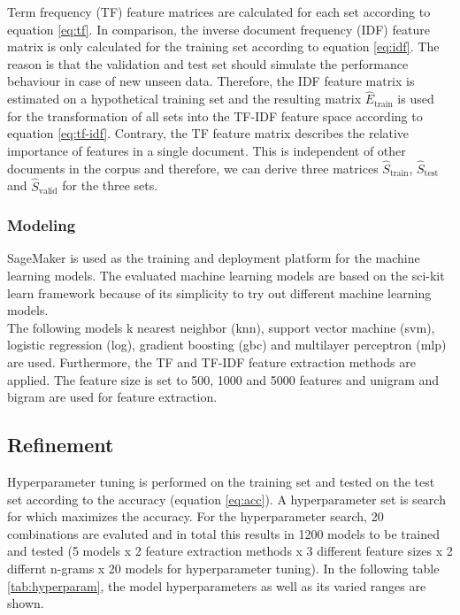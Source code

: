 \documentclass[a4paper,12pt,nottoc]{article}
\begin{document}
\noindent Term frequency (TF) feature matrices are calculated for each set according to equation \ref{eq:tf}. In comparison, the inverse document frequency (IDF) feature matrix is only calculated for the training set according to equation \ref{eq:idf}. The reason is that the validation and test set should simulate the performance behaviour in case of new unseen data. Therefore,  the IDF feature matrix is estimated on a hypothetical training set and the resulting matrix $\hat{E}_{\textrm{train}}$ is used for the transformation of all sets into the TF-IDF feature space according to equation \ref{eq:tf-idf}. Contrary, the TF feature matrix describes the relative importance of features in a single document. This is independent of other documents in the corpus and therefore, we can derive three matrices $\hat{S}_{\textrm{train}}$, $\hat{S}_{\textrm{test}}$ and $\hat{S}_{\textrm{valid}}$ for the three sets.

\subsubsection{Modeling}

\noindent SageMaker \cite{bib:sagemaker} is used as the training and deployment platform for the machine learning models. The evaluated machine learning models are based on the sci-kit learn framework \cite{bib:scikit-learn} because of its simplicity to try out different machine learning models.\\

\noindent The following models k nearest neighbor (knn), support vector machine (svm), logistic regression (log), gradient boosting (gbc) and multilayer perceptron (mlp) are used. Furthermore, the TF and TF-IDF feature extraction methods are applied. The feature size is set to 500, 1000 and 5000 features and unigram and bigram are used for feature extraction.

\subsection{Refinement}

Hyperparameter tuning is performed on the training set and tested on the test set according to the accuracy (equation \ref{eq:acc}). A hyperparameter set is search for which maximizes the accuracy. For the hyperparameter search, 20 combinations are evaluted and in total this results in 1200 models to be trained and tested (5 models x 2 feature extraction methods x 3 different feature sizes x 2 differnt n-grams x 20 models for hyperparameter tuning). In the following table \ref{tab:hyperparam}, the model hyperparameters as well as its varied ranges are shown. 
\end{document}
